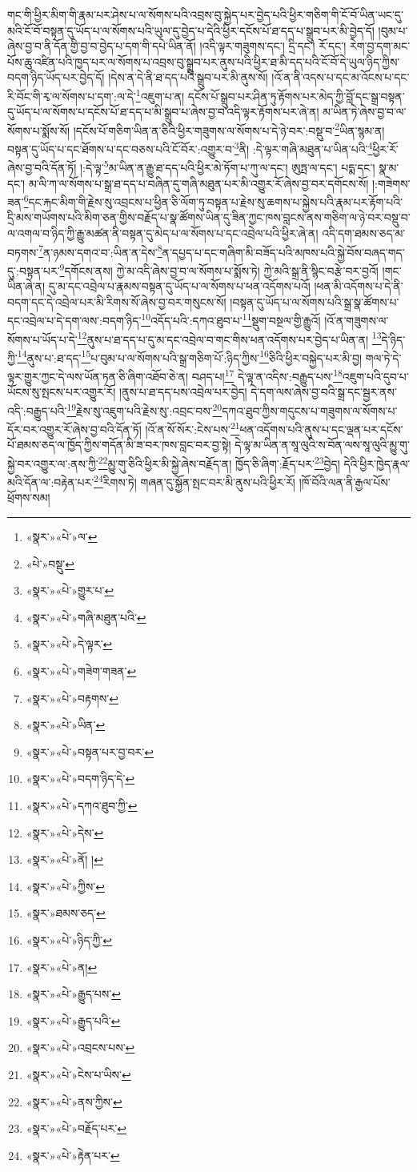 གང་གི་ཕྱིར་མིག་གི་རྣམ་པར་ཤེས་པ་ལ་སོགས་པའི་འབྲས་བུ་སྐྱེད་པར་བྱེད་པའི་ཕྱིར་གཅིག་གི་ངོ་བོ་ཡིན་ཡང་དུ་མའི་ངོ་བོ་བསྟན་དུ་ཡོད་པ་ལ་སོགས་པའི་ཡུལ་དུ་བྱེད་པ་དེའི་ཕྱིར་དངོས་པོ་ཐ་དད་པ་སྒྲུབ་པར་མི་བྱེད་དོ། །བུམ་པ་ཞེས་བྱ་བ་ནི་དོན་གྱི་བྱ་བ་བྱེད་པ་དག་གི་དཔེ་ཡིན་ནོ། །འདི་ལྟར་གཟུགས་དང་། དྲི་དང་། རོ་དང་། རེག་བྱ་དག་མང་པོས་ཆུ་འཛིན་པའི་ཁྱད་པར་ལ་སོགས་པ་འབྲས་བུ་སྒྲུབ་པར་ནུས་པའི་ཕྱིར་ཐ་མི་དད་པའི་ངོ་བོ་དེ་ཡུལ་ཉིད་ཀྱིས་བདག་ཉིད་ཡོད་པར་བྱེད་དོ། །དེས་ན་དེ་ནི་ཐ་དད་པའི་སྒྲུབ་པར་མི་ནུས་སོ། །འོ་ན་ནི་འདས་པ་དང་མ་འོངས་པ་དང་རི་བོང་གི་རྭ་ལ་སོགས་པ་དག་:ལ་དེ་\footnote{«སྣར་»«པེ་»ལ་}འཇུག་པ་ན། དངོས་པོ་སྒྲུབ་པར་ཤིན་ཏུ་རྟོགས་པར་མེད་ཀྱི་བློ་དང་སྒྲ་བསྟན་དུ་ཡོད་པ་ལ་སོགས་པ་དངོས་པོ་ཐ་དད་པ་མི་སྒྲུབ་པ་ཞེས་བྱ་བ་འདི་ལྟར་རྟོགས་པར་ཞེ་ན། མ་ཡིན་ཏེ་ཞེས་བྱ་བ་ལ་སོགས་པ་སྨོས་སོ། །དངོས་པོ་གཅིག་ཡིན་ན་ཅིའི་ཕྱིར་གཟུགས་ལ་སོགས་པ་དེ་ཉེ་བར་:བསྡུ་བ་\footnote{«པེ་»བསྡུ་}ཡིན་སྙམ་ན། བསྟན་དུ་ཡོད་པ་དང་ཐོགས་པ་དང་བཅས་པའི་ངོ་བོར་:འགྱུར་བ་\footnote{«སྣར་»«པེ་»གྱུར་པ་}ནི། :དེ་ལྟར་གཞི་མཐུན་པ་ཡིན་པའི་\footnote{«སྣར་»«པེ་»གཞི་མཐུན་པའི་}ཕྱིར་རོ་ཞེས་བྱ་བའི་དོན་ཏོ། །:དེ་ལྟ་\footnote{«སྣར་»«པེ་»དེ་ལྟར་}མ་ཡིན་ན་རྒྱུ་ཐ་དད་པའི་ཕྱིར་མེ་ཏོག་པ་ཀུ་ལ་དང་། ཨུཏྤ་ལ་དང་། པདྨ་དང་། སྣ་མ་དང་། མ་ལི་ཀ་ལ་སོགས་པ་སྒྲ་ཐ་དད་པ་བཞིན་དུ་གཞི་མཐུན་པར་མི་འགྱུར་རོ་ཞེས་བྱ་བར་དགོངས་སོ། །:གཟེགས་ཟན་\footnote{«སྣར་»«པེ་»གཟེག་གཟན་}དང་རྐང་མིག་གི་རྗེས་སུ་འབྲངས་པ་ཕྱིན་ཅི་ལོག་ཏུ་བསྟན་པ་རྗེས་སུ་ཆགས་པ་སྐྱེས་པའི་རྣམ་པར་རྟོག་པའི་དྲི་མས་གཡོགས་པའི་མིག་ཅན་གྱིས་བརྗོད་པ་སྣ་ཚོགས་ཡིན་དུ་ཟིན་ཀྱང་ཁས་བླངས་ནས་གཅིག་ལ་ཉེ་བར་བསྡུ་བ་ལ་འགལ་བ་ཉིད་ཀྱི་རྒྱུ་མཚན་ནི་བསྟན་དུ་མེད་པ་ལ་སོགས་པ་དང་འབྲེལ་པའི་ཕྱིར་ཞེ་ན། འདི་དག་ཐམས་ཅད་མ་བཏགས་\footnote{«སྣར་»«པེ་»བརྟགས་}ན་ཉམས་དགའ་བ་:ཡིན་ན་དེས་\footnote{«སྣར་»«པེ་»ཡིན་}ན་དཔྱད་པ་དང་གཞིག་མི་བཟོད་པའི་མཁས་པའི་སྐྱེ་བོས་བཞད་གད་དུ་:བསྟན་པར་\footnote{«སྣར་»«པེ་»བསྟན་པར་བྱ་བར་}དགོངས་ནས། ཀྱེ་མ་འདི་ཞེས་བྱ་བ་ལ་སོགས་པ་སྨོས་ཏེ། ཀྱེ་མའི་སྒྲ་ནི་སྙིང་བརྩེ་བར་བྱའོ། །གང་ཡིན་ཞེ་ན། དུ་མ་དང་འབྲེལ་པ་རྣམས་བསྟན་དུ་ཡོད་པ་ལ་སོགས་པ་ཕན་འདོགས་པའོ། །ཕན་མི་འདོགས་པ་དེ་ནི་བདག་དང་དེ་འབྲེལ་པར་མི་རིགས་སོ་ཞེས་བྱ་བར་གསུངས་སོ། །བསྟན་དུ་ཡོད་པ་ལ་སོགས་པའི་སྒྲ་སྣ་ཚོགས་པ་དང་འབྲེལ་པ་དེ་དག་ལས་:བདག་ཉིད་\footnote{«སྣར་»«པེ་»བདག་ཉིད་དེ་}འདོད་པའི་:དཀའ་ཐུབ་པ་\footnote{«སྣར་»«པེ་»དཀའ་ཐུབ་ཀྱི་}སྡུག་བསྔལ་གྱི་རྒྱུའོ། །འོ་ན་གཟུགས་ལ་སོགས་པ་ཡོད་པ་དེ་\footnote{«སྣར་»«པེ་»དེས་}ནུས་པ་ཐ་དད་པ་དུ་མ་དང་འབྲེལ་བ་གང་གིས་ཕན་འདོགས་པར་བྱེད་པ་ཡིན་ན། \footnote{«སྣར་»«པེ་»ནོ། ། }དེ་ཉིད་ཀྱི་\footnote{«སྣར་»«པེ་»ཀྱིས་}ནུས་པ་:ཐ་དད་\footnote{«སྣར་»ཐམས་ཅད་}པ་བུམ་པ་ལ་སོགས་པའི་སྒྲ་གཅིག་པོ་:ཉིད་ཀྱིས་\footnote{«སྣར་»«པེ་»ཉིད་ཀྱི་}ཅིའི་ཕྱིར་བསྐྱེད་པར་མི་བྱ། གལ་ཏེ་དེ་ལྟར་གྱུར་ཀྱང་དེ་ལས་ཡོན་ཏན་ཅི་ཞིག་འཐོབ་ཅེ་ན། བཤད་པ།\footnote{«སྣར་»«པེ་»ན།} དེ་ལྟ་ན་འདིས་:བརྒྱུད་པས་\footnote{«སྣར་»«པེ་»རྒྱུད་པས་}འཇུག་པའི་དུབ་པ་ཡོངས་སུ་སྤངས་པར་འགྱུར་རོ། །ནུས་པ་ཐ་དད་པས་འབྲེལ་པར་བྱེད། དེ་དག་ལས་ཞེས་བྱ་བའི་སྒྲ་དང་སྦྱར་ནས་འདི་:བརྒྱུད་པའི་\footnote{«སྣར་»«པེ་»རྒྱུད་པའི་}རྗེས་སུ་འཇུག་པའི་རྗེས་སུ་:འབྲང་བས་\footnote{«སྣར་»«པེ་»འབྲངས་པས་}དཀའ་ཐུབ་ཀྱིས་གདུངས་པ་གཟུགས་ལ་སོགས་པ་དོར་བར་འགྱུར་རོ་ཞེས་བྱ་བའི་དོན་ཏོ། །འོ་ན་སོ་སོར་:ངེས་པས་\footnote{«སྣར་»«པེ་»ངེས་པ་ཡིས་}ཕན་འདོགས་པའི་ནུས་པ་དང་ལྡན་པར་དངོས་པོ་ཐམས་ཅད་ལ་ཁྱོད་ཀྱིས་གདོན་མི་ཟ་བར་ཁས་བླང་བར་བྱ་སྟེ། དེ་ལྟ་མ་ཡིན་ན་སཱ་ལུའི་ས་བོན་ལས་སཱ་ལུའི་མྱུ་གུ་སྐྱེ་བར་འགྱུར་ལ་:ནས་ཀྱི་\footnote{«སྣར་»«པེ་»ནས་ཀྱིས་}མྱུ་གུ་ཅིའི་ཕྱིར་མི་སྐྱེ་ཞེས་བརྗོད་ན། ཁྱོད་ཅི་ཞིག་:རྗོད་པར་\footnote{«སྣར་»«པེ་»བརྗོད་པར་}བྱེད། དེའི་ཕྱིར་ཁྱེད་རྣལ་མའི་དོན་ལ་:བརྟེན་པར་\footnote{«སྣར་»«པེ་»རྟེན་པར་}རིགས་ཏེ། གཞན་དུ་སྐྱོན་སྤང་བར་མི་ནུས་པའི་ཕྱིར་རོ། །ཁོ་བོའི་ལན་ནི་རྒྱལ་པོས་ཕྲོགས་སམ། 